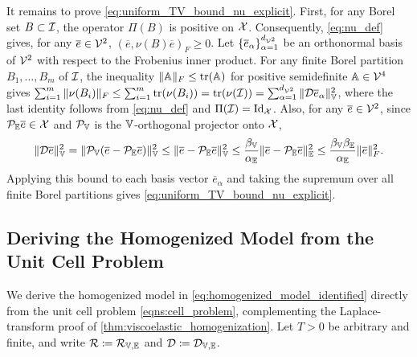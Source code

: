 It remains to prove \cref{eq:uniform_TV_bound_nu_explicit}. First, 
for any Borel set $B\subset{\mathcal{I}}$, the operator $\Pi(B)$ is positive on ${\mathcal{X}}$. Consequently, \cref{eq:nu_def} gives, for any $\overline{e} \in {\mathcal{V}}^{2}$, $(\overline{e}, \nu(B)\overline{e})_F\geq 0$. Let $\{\overline e_\alpha\}_{\alpha=1}^{d_{{\mathcal{V}}^2}}$ be an orthonormal basis of ${\mathcal{V}}^2$ with respect to the Frobenius inner product. For any finite Borel partition $B_1,\dots,B_m$ of ${\mathcal{I}}$, the inequality $\|\mathbb{A}\|_F\le \operatorname{tr}(\mathbb{A})$ for positive semidefinite $\mathbb{A}\in{\mathcal{V}}^4$ gives $\sum_{i=1}^m \|\nu(B_i)\|_F
\le \sum_{i=1}^m \operatorname{tr}(\nu(B_i))
=\operatorname{tr}(\nu({\mathcal{I}}))
=\sum_{\alpha=1}^{d_{{\mathcal{V}}^2}}\|{\mathcal{D}}\overline e_\alpha\|_{\mathbb{V}}^2$, where the last identity follows from \cref{eq:nu_def} and {$\Pi({\mathcal{I}})=\mathrm{Id}_{{\mathcal{X}}}$}. Also, for any $\overline e\in{\mathcal{V}}^2$, since ${\mathcal{P}}_{\mathbb{E}}\overline e\in{\mathcal{X}}$ and ${\mathcal{P}}_{\mathbb{V}}$ is the $\mathbb{V}$-orthogonal projector onto ${\mathcal{X}}$,
\begin{equation}\label{eq:mismatch_bound}
\|{\mathcal{D}}\overline e\|_{\mathbb{V}}^2
=\|{\mathcal{P}}_{\mathbb{V}}(\overline e-{\mathcal{P}}_{\mathbb{E}}\overline e)\|_{\mathbb{V}}^2
\le \|\overline e-{\mathcal{P}}_{\mathbb{E}}\overline e\|_{\mathbb{V}}^2
\le \frac{\beta_{\mathbb{V}}}{\alpha_{\mathbb{E}}}\|\overline e-{\mathcal{P}}_{\mathbb{E}}\overline e\|_{\mathbb{E}}^2
\le \frac{\beta_{\mathbb{V}}\beta_{\mathbb{E}}}{\alpha_{\mathbb{E}}}\|\overline e\|_F^2.
\end{equation}
Applying this bound to each basis vector $\overline e_\alpha$ and taking the supremum over all finite Borel partitions gives \cref{eq:uniform_TV_bound_nu_explicit}.

\subsection{Deriving the Homogenized Model from the Unit Cell Problem} \label{app:unit_cell_homogenization}

We derive the homogenized model in \cref{eq:homogenized_model_identified} directly from the unit cell problem \cref{eqns:cell_problem}, complementing the Laplace-transform proof of \cref{thm:viscoelastic_homogenization}. {Let $T>0$ be arbitrary and finite, and write} ${\mathcal{R}}\coloneqq{\mathcal{R}}_{\mathbb{V},\mathbb{E}}$ and ${\mathcal{D}}\coloneqq{\mathcal{D}}_{\mathbb{V},\mathbb{E}}$.

